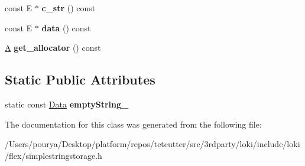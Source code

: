 \begin{DoxyCompactItemize}
\item 
\hypertarget{classSimpleStringStorage_ab8dd934ed435e2083475fce679432b36}{}const E $\ast$ {\bfseries c\+\_\+str} () const \label{classSimpleStringStorage_ab8dd934ed435e2083475fce679432b36}

\item 
\hypertarget{classSimpleStringStorage_a59e8f19f0b62febae12c0c8f13c7b90c}{}const E $\ast$ {\bfseries data} () const \label{classSimpleStringStorage_a59e8f19f0b62febae12c0c8f13c7b90c}

\item 
\hypertarget{classSimpleStringStorage_ad2e973b3f74bcf1ee2ddc59918630a20}{}\hyperlink{structA}{A} {\bfseries get\+\_\+allocator} () const \label{classSimpleStringStorage_ad2e973b3f74bcf1ee2ddc59918630a20}

\end{DoxyCompactItemize}
\subsection*{Static Public Attributes}
\begin{DoxyCompactItemize}
\item 
\hypertarget{classSimpleStringStorage_a75a33edf5d762c7b347119ba7a7874c8}{}static const \hyperlink{structSimpleStringStorage_1_1Data}{Data} {\bfseries empty\+String\+\_\+}\label{classSimpleStringStorage_a75a33edf5d762c7b347119ba7a7874c8}

\end{DoxyCompactItemize}


The documentation for this class was generated from the following file\+:\begin{DoxyCompactItemize}
\item 
/\+Users/pourya/\+Desktop/platform/repos/tetcutter/src/3rdparty/loki/include/loki/flex/simplestringstorage.\+h\end{DoxyCompactItemize}
